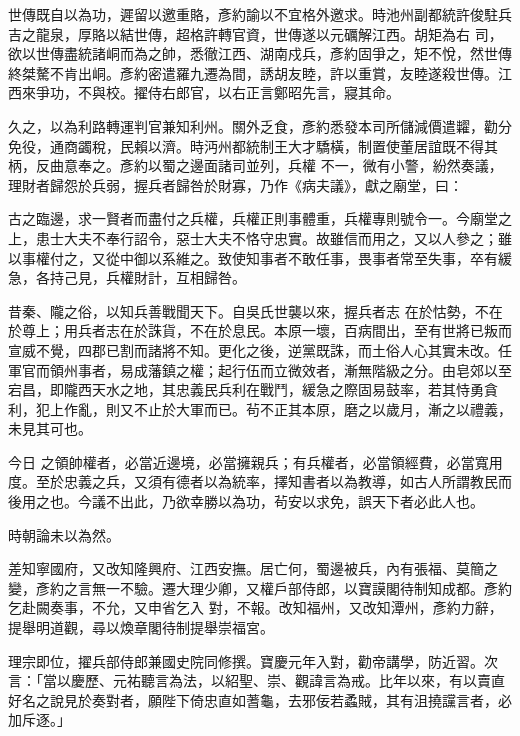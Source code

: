\begin{pinyinscope}
 世傳既自以為功，遲留以邀重賂，彥約諭以不宜格外邀求。時池州副都統許俊駐兵吉之龍泉，厚賂以結世傳，超格許轉官資，世傳遂以元礪解江西。胡矩為右
 司，欲以世傳盡統諸峒而為之帥，悉徹江西、湖南戍兵，彥約固爭之，矩不悅，然世傳終桀驁不肯出峒。彥約密遣羅九遷為間，誘胡友睦，許以重賞，友睦遂殺世傳。江西來爭功，不與校。擢侍右郎官，以右正言鄭昭先言，寢其命。



 久之，以為利路轉運判官兼知利州。關外乏食，彥約悉發本司所儲減價遣糶，勸分免役，通商蠲稅，民賴以濟。時沔州都統制王大才驕橫，制置使董居誼既不得其柄，反曲意奉之。彥約以蜀之邊面諸司並列，兵權
 不一，微有小警，紛然奏議，理財者歸怨於兵弱，握兵者歸咎於財寡，乃作《病夫議》，獻之廟堂，曰：



 古之臨邊，求一賢者而盡付之兵權，兵權正則事體重，兵權專則號令一。今廟堂之上，患士大夫不奉行詔令，惡士大夫不恪守忠實。故雖信而用之，又以人參之；雖以事權付之，又從中御以系維之。致使知事者不敢任事，畏事者常至失事，卒有緩急，各持己見，兵權財計，互相歸咎。



 昔秦、隴之俗，以知兵善戰聞天下。自吳氏世襲以來，握兵者志
 在於怙勢，不在於尊上；用兵者志在於誅貨，不在於息民。本原一壞，百病間出，至有世將已叛而宣威不覺，四郡已割而諸將不知。更化之後，逆黨既誅，而土俗人心其實未改。任軍官而領州事者，易成藩鎮之權；起行伍而立微效者，漸無階級之分。由皂郊以至宕昌，即隴西天水之地，其忠義民兵利在戰鬥，緩急之際固易鼓率，若其恃勇貪利，犯上作亂，則又不止於大軍而已。茍不正其本原，磨之以歲月，漸之以禮義，未見其可也。



 今日
 之領帥權者，必當近邊境，必當擁親兵；有兵權者，必當領經費，必當寬用度。至於忠義之兵，又須有德者以為統率，擇知書者以為教導，如古人所謂教民而後用之也。今議不出此，乃欲幸勝以為功，茍安以求免，誤天下者必此人也。



 時朝論未以為然。



 差知寧國府，又改知隆興府、江西安撫。居亡何，蜀邊被兵，內有張福、莫簡之變，彥約之言無一不驗。遷大理少卿，又權戶部侍郎，以寶謨閣待制知成都。彥約乞赴闕奏事，不允，又申省乞入
 對，不報。改知福州，又改知潭州，彥約力辭，提舉明道觀，尋以煥章閣待制提舉崇福宮。



 理宗即位，擢兵部侍郎兼國史院同修撰。寶慶元年入對，勸帝講學，防近習。次言：「當以慶歷、元祐聽言為法，以紹聖、崇、觀諱言為戒。比年以來，有以賣直好名之說見於奏對者，願陛下倚忠直如蓍龜，去邪佞若蟊賊，其有沮撓讜言者，必加斥逐。」




\end{pinyinscope}
